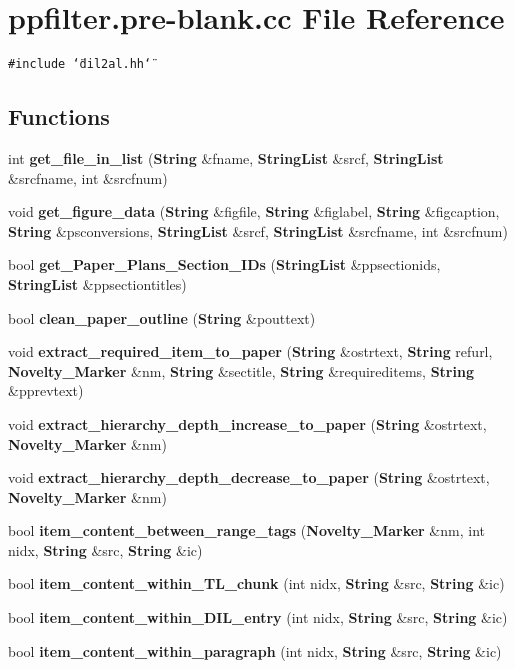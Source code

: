 \section{ppfilter.pre-blank.cc File Reference}
\label{ppfilter_8pre-blank_8cc}
{\tt \#include \char`\"{}dil2al.hh\char`\"{}}\par
\subsection*{Functions}
\begin{CompactItemize}
\item 
int {\bf get\_\-file\_\-in\_\-list} ({\bf String} \&fname, {\bf String\-List} \&srcf, {\bf String\-List} \&srcfname, int \&srcfnum)
\item 
void {\bf get\_\-figure\_\-data} ({\bf String} \&figfile, {\bf String} \&figlabel, {\bf String} \&figcaption, {\bf String} \&psconversions, {\bf String\-List} \&srcf, {\bf String\-List} \&srcfname, int \&srcfnum)
\item 
bool {\bf get\_\-Paper\_\-Plans\_\-Section\_\-IDs} ({\bf String\-List} \&ppsectionids, {\bf String\-List} \&ppsectiontitles)
\item 
bool {\bf clean\_\-paper\_\-outline} ({\bf String} \&pouttext)
\item 
void {\bf extract\_\-required\_\-item\_\-to\_\-paper} ({\bf String} \&ostrtext, {\bf String} refurl, {\bf Novelty\_\-Marker} \&nm, {\bf String} \&sectitle, {\bf String} \&requireditems, {\bf String} \&pprevtext)
\item 
void {\bf extract\_\-hierarchy\_\-depth\_\-increase\_\-to\_\-paper} ({\bf String} \&ostrtext, {\bf Novelty\_\-Marker} \&nm)
\item 
void {\bf extract\_\-hierarchy\_\-depth\_\-decrease\_\-to\_\-paper} ({\bf String} \&ostrtext, {\bf Novelty\_\-Marker} \&nm)
\item 
bool {\bf item\_\-content\_\-between\_\-range\_\-tags} ({\bf Novelty\_\-Marker} \&nm, int nidx, {\bf String} \&src, {\bf String} \&ic)
\item 
bool {\bf item\_\-content\_\-within\_\-TL\_\-chunk} (int nidx, {\bf String} \&src, {\bf String} \&ic)
\item 
bool {\bf item\_\-content\_\-within\_\-DIL\_\-entry} (int nidx, {\bf String} \&src, {\bf String} \&ic)
\item 
bool {\bf item\_\-content\_\-within\_\-paragraph} (int nidx, {\bf String} \&src, {\bf String} \&ic)
\item 

\end{CompactItemize}
